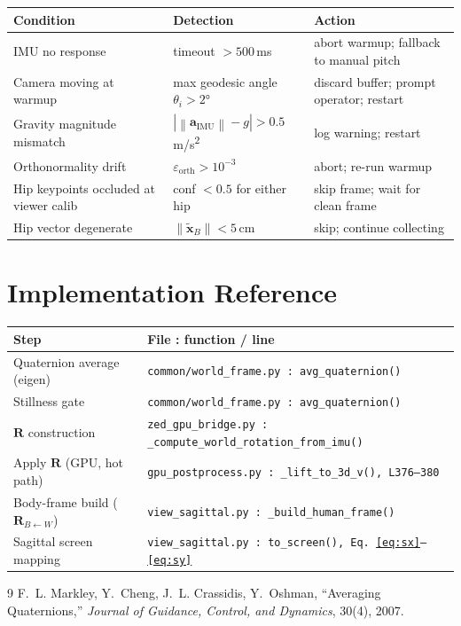\documentclass[11pt, a4paper]{article}
\newcommand{\vv}[1]{\bm{#1}}          %
\newcommand{\mat}[1]{\mathbf{#1}}     %
\newcommand{\norm}[1]{\left\lVert #1 \right\rVert}
\newcommand{\Rtrans}[2]{\mat{R}_{#1 \leftarrow #2}}  %
\theoremstyle{definition}
\begin{document}
\begin{center}
\begin{tabular}{p{5cm}p{4cm}p{5cm}}
\toprule
Condition & Detection & Action \\
\midrule
IMU no response & timeout $> 500$\,ms & abort warmup; fallback to manual pitch \\
Camera moving at warmup & max geodesic angle $\theta_i > 2°$ & discard buffer; prompt operator; restart \\
Gravity magnitude mismatch & $|\norm{\vv{a}_\text{IMU}} - g| > 0.5$\,m/s\textsuperscript{2} & log warning; restart \\
Orthonormality drift & $\varepsilon_{\mathrm{orth}} > 10^{-3}$ & abort; re-run warmup \\
Hip keypoints occluded at viewer calib & conf $< 0.5$ for either hip & skip frame; wait for clean frame \\
Hip vector degenerate & $\norm{\tilde{\vv{x}}_B} < 5$\,cm & skip; continue collecting \\
\bottomrule
\end{tabular}
\end{center}

\section{Implementation Reference}

\begin{center}
\begin{tabular}{ll}
\toprule
Step & File : function / line \\
\midrule
Quaternion average (eigen) & \texttt{common/world\_frame.py : avg\_quaternion()} \\
Stillness gate              & \texttt{common/world\_frame.py : avg\_quaternion()} \\
$\mat{R}$ construction      & \texttt{zed\_gpu\_bridge.py : \_compute\_world\_rotation\_from\_imu()} \\
Apply $\mat{R}$ (GPU, hot path) & \texttt{gpu\_postprocess.py : \_lift\_to\_3d\_v(), L376--380} \\
Body-frame build ($\Rtrans{B}{W}$) & \texttt{view\_sagittal.py : \_build\_human\_frame()} \\
Sagittal screen mapping     & \texttt{view\_sagittal.py : to\_screen(), Eq.\,\eqref{eq:sx}--\eqref{eq:sy}} \\
\bottomrule
\end{tabular}
\end{center}

\begin{thebibliography}{9}
  F.~L. Markley, Y.~Cheng, J.~L. Crassidis, Y.~Oshman,
  ``Averaging Quaternions,''
  \textit{Journal of Guidance, Control, and Dynamics}, 30(4), 2007.
\end{thebibliography}
\end{document}
